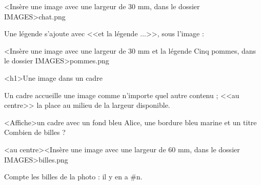 \documentclass[marges=20, taille=11]{texecole}
\begin{document}
	<Insère une image avec une largeur de 30 mm, dans le dossier {IMAGES}>{chat.png}
	
	Une légende s'ajoute avec <<et la légende {...}>>, sous l'image :
	
	<Insère une image avec une largeur de 30 mm et la légende {Cinq pommes}, dans le dossier {IMAGES}>{pommes.png}
	
	<h1>Une image dans un cadre
	
	Un cadre accueille une image comme n'importe quel autre contenu ;
	<<au centre>> la place au milieu de la largeur disponible.
	
	<Affiche>un cadre avec un fond bleu Alice, une bordure bleu marine et un titre {Combien de billes ?} {
		<au centre>{<Insère une image avec une largeur de 60 mm, dans le dossier {IMAGES}>{billes.png}}
		
		Compte les billes de la photo : il y en a #n.
	}
	
\end{document}
